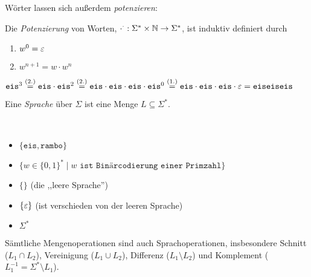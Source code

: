 Wörter lassen sich außerdem \emph{potenzieren}:
\begin{Def}
  Die \emph{Potenzierung} von Worten, $\cdot ^ \cdot: \Sigma^*\times \mathbb{N} \to \Sigma^*$, ist induktiv definiert durch
  \begin{enumerate}
  \item $w^0 = \varepsilon$ 
  \item $w^{n+1} = w \cdot w^n$
  \end{enumerate}
\end{Def}
\begin{Bsp*} $\mathtt{eis}^3 
\stackrel{(2.)}{=} \mathtt{eis}\cdot\mathtt{eis}^2 
\stackrel{(2.)}{=} \mathtt{eis}\cdot\mathtt{eis}\cdot\mathtt{eis}\cdot\mathtt{eis}^0
\stackrel{(1.)}{=} \mathtt{eis}\cdot\mathtt{eis}\cdot\mathtt{eis}\cdot\varepsilon
= \mathtt{eiseiseis}
$
\end{Bsp*}

\begin{Def}[name={[Sprache über $\Sigma$]}]
	Eine \emph{Sprache} über $\Sigma$ ist eine Menge $L\subseteq\Sigma^*$.
\end{Def}
\begin{Bsp*}~ 
  \begin{itemize}
  \item 
	$\{\mathtt{eis}, \mathtt{rambo}\}$
  \item
    $\{w\in\{0,1\}^*\mid w \texttt{ ist Bin\"arcodierung einer Primzahl}\}$
  \item $\{\}$ (die ,,leere Sprache'')
  \item $\{ \varepsilon \}$ (ist verschieden von der leeren Sprache)
  \item $\Sigma^*$
  \end{itemize}
\end{Bsp*}
Sämtliche Mengenoperationen sind auch Sprachoperationen, insbesondere Schnitt ($L_1 \cap L_2$), Vereinigung ($L_1 \cup L_2$), Differenz ($L_1 \setminus L_2$) und Komplement ($L_1^{-1} = \Sigma^* \setminus L_1$).

